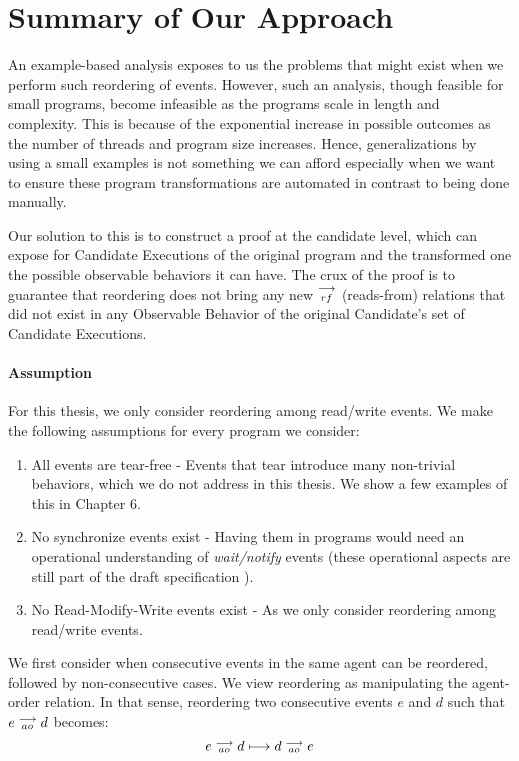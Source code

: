 \section{Summary of Our Approach}

    An example-based analysis exposes to us the problems that might exist when we perform such reordering of events. 
    However, such an analysis, though feasible for small programs, become infeasible as the programs scale in length and complexity. 
    This is because of the exponential increase in possible outcomes as the number of threads and program size increases. 
    Hence, generalizations by using a small examples is not something we can afford especially when we want to ensure these program transformations are automated in contrast to being done manually.
    
    Our solution to this is to construct a proof at the candidate level, which can expose for Candidate Executions of the original program and the transformed one the possible observable behaviors it can have.   
    The crux of the proof is to guarantee that reordering does not bring any new $\stackrel{\longrightarrow}{_{rf}}$ (reads-from) relations that did not exist in any Observable Behavior of the original Candidate's set of Candidate Executions. 
    
    \paragraph{Assumption}
    For this thesis, we only consider reordering among read/write events.
    We make the following assumptions for every program we consider:
    \begin{enumerate}
        \item All events are tear-free - Events that tear introduce many non-trivial behaviors, which we do not address in this thesis. We show a few examples of this in Chapter 6.
        \item No synchronize events exist - Having them in programs would need an operational understanding of \textit{wait/notify} events (these operational aspects are still part of the draft specification \cite{ECMA}). 
        \item No Read-Modify-Write events exist - As we only consider reordering among read/write events.
    \end{enumerate}
    
    We first consider when consecutive events in the same agent can be reordered, followed by non-consecutive cases. 
    We view reordering as manipulating the agent-order relation. 
    In that sense, reordering two consecutive events $e$ and $d$ such that $e \stackrel{\longrightarrow}{_{ao}} d$ becomes:
    \[
        e \stackrel{\longrightarrow}{_{ao}} d 
        \longmapsto
        d \stackrel{\longrightarrow}{_{ao}} e 
    \]

